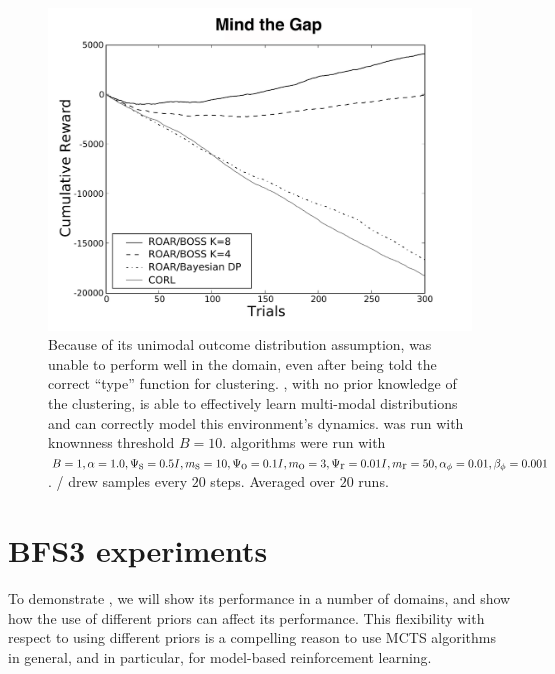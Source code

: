 \begin{figure}[t]
\vskip 0.2in
\begin{center}
\centerline{\includegraphics[width=\columnwidth]{bridge2Figure}}
\caption{Because of its unimodal outcome distribution assumption,  was unable to perform well in the  domain, even after being told the correct ``type'' function for clustering. , with no prior knowledge of the clustering, is able to effectively learn multi-modal distributions and can correctly model this environment's dynamics.  was run with knownness threshold $B=10$.  algorithms were run with $B=1, \alpha=1.0,\Psi_{\mbox s}=0.5I, m_{\mbox s}=10, \Psi_{\mbox o}=0.1I, m_{\mbox o}=3, \Psi_{\mbox r}=0.01I,m_{\mbox r}=50,\alpha_\phi=0.01,\beta_\phi=0.001$. / drew samples every $20$ steps. Averaged over $20$ runs.}
\label{fig:bridge2}
\end{center}
\vskip -0.2in
\end{figure} 






\section{BFS3 experiments}

To demonstrate , we will show its performance in a number of domains, and show how the use of different priors can affect its performance.  This flexibility with respect to using different priors is a compelling reason to use MCTS algorithms in general, and  in particular, for model-based reinforcement learning.

